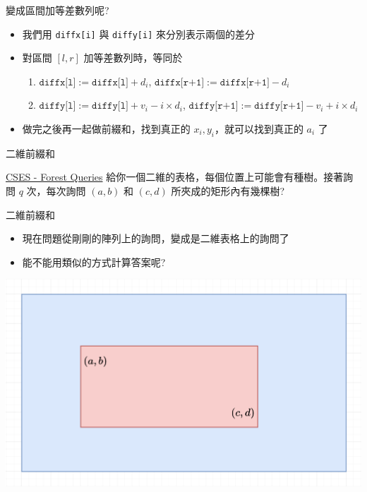 \documentclass[aspectratio=169]{beamer}
\begin{document}
    \begin{frame}{變成區間加等差數列呢?}
        \begin{itemize}
            \item 我們用 \texttt{diffx[i]} 與 \texttt{diffy[i]} 來分別表示兩個的差分
            \item 對區間 $[l,r]$ 加等差數列時，等同於
                \begin{enumerate}
                    \item $\texttt{diffx[l]} := \texttt{diffx[l]} + d_i$, $\texttt{diffx[r+1]} := \texttt{diffx[r+1]} - d_i$
                    \item $\texttt{diffy[l]} := \texttt{diffy[l]} + v_i - i \times d_i$, $\texttt{diffy[r+1]} := \texttt{diffy[r+1]} - v_i + i \times d_i$
                \end{enumerate}
            \item 做完之後再一起做前綴和，找到真正的 $x_i, y_i$，就可以找到真正的 $a_i$ 了
        \end{itemize}
    \end{frame}
    
    \begin{frame}{二維前綴和}
        \begin{block}{\href{https://cses.fi/problemset/task/1652}{CSES - Forest Queries}}
            給你一個二維的表格，每個位置上可能會有種樹。接著詢問 $q$ 次，每次詢問 $(a,b)$ 和 $(c,d)$ 所夾成的矩形內有幾棵樹?
        \end{block}
    \end{frame}
    
    \begin{frame}{二維前綴和}
        \begin{itemize}
            \item 現在問題從剛剛的陣列上的詢問，變成是二維表格上的詢問了
            \item 能不能用類似的方式計算答案呢?
        \end{itemize}
        \begin{center}
            \includegraphics[scale=0.35]{images/2d_prefix_sum.png}
        \end{center}
    \end{frame}
    
\end{document}

